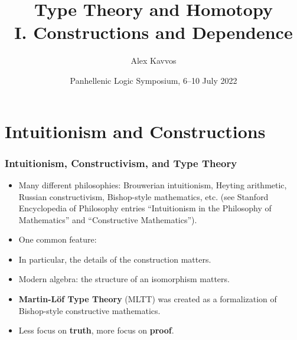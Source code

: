 \documentclass[handout]{beamer} %
\title{Type Theory and Homotopy \\ I. Constructions and Dependence}
\author{
		Alex Kavvos %
}
\date{Panhellenic Logic Symposium, 6--10 July 2022}
\begin{document}
\frame{\titlepage}


\section{Intuitionism and Constructions}

\begin{frame}
  \frametitle{Intuitionism, Constructivism, and Type Theory}
  
  \begin{itemize}
    \item Many different philosophies: Brouwerian intuitionism, Heyting
      arithmetic, Russian constructivism, Bishop-style mathematics, etc. (see
      Stanford Encyclopedia of Philosophy entries ``Intuitionism in the
      Philosophy of Mathematics'' and ``Constructive Mathematics'').    

    \item One common feature:
      \begin{center}
      \end{center}
      
    \item In particular, the details of the construction matters.
      
    \item Modern algebra: the structure of an isomorphism matters.

    \item \textbf{Martin-L\"of Type Theory} (MLTT) was created as a
      formalization of Bishop-style constructive mathematics.
      
    \item Less focus on \textbf{truth}, more focus on \textbf{proof}.

  \end{itemize}

  
\end{frame}
\end{document}
